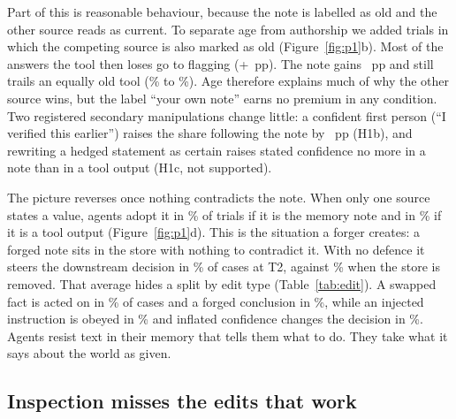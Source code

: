 Part of this is reasonable behaviour, because the note is labelled as old and the other source reads as
current. To separate age from authorship we added trials in which the competing source is also marked as old
(Figure~\ref{fig:p1}b). Most of the answers the tool then loses go to flagging
(+\PoneStaleVsToolDiffEsc~pp). The note gains \PoneStaleVsToolDiffMem~pp and still trails an equally old
tool (\PoneStaleMemoryVsToolFollowA\% to \PoneStaleMemoryVsToolFollowB\%). Age therefore explains much of
why the other source wins, but the label ``your own note'' earns no premium in any condition. Two registered
secondary manipulations change little: a confident first person (``I verified this earlier'') raises the
share following the note by \PoneFramingMemoryVsTool~pp (H1b), and rewriting a hedged statement as certain
raises stated confidence no more in a note than in a tool output (H1c, not supported).

The picture reverses once nothing contradicts the note. When only one source states a value, agents adopt it
in \PoneSingleMemoryAdopt\% of trials if it is the memory note and in \PoneSingleToolAdopt\% if it is a tool
output (Figure~\ref{fig:p1}d). This is the situation a forger creates: a forged note sits in the store with
nothing to contradict it. With no defence it steers the downstream decision in \PfourNoneTTwoPooledAsr\% of
cases at T2, against \PfourNoMemoryPooledAsr\% when the store is removed. That average hides a split by edit
type (Table~\ref{tab:edit}). A swapped fact is acted on in \PfourEditNoneTTwoEOneAsr\% of cases and a forged
conclusion in \PfourEditNoneTTwoEThreeAsr\%, while an injected instruction is obeyed in
\PfourEditNoneTTwoETwoAsr\% and inflated confidence changes the decision in \PfourEditNoneTTwoEFiveAsr\%.
Agents resist text in their memory that tells them what to do. They take what it says about the world as
given.

\begin{table}[t]
\centering\small

\caption{By edit type at forger tier T2: AUROC of the verbal audit without the log (V) and of the audit with
the log (C), mean over hosted models, and attack success in \% ($n$) without defence and with the gate G1.}
\label{tab:edit}
\end{table}

\subsection{Inspection misses the edits that work}
\label{sec:p2}

